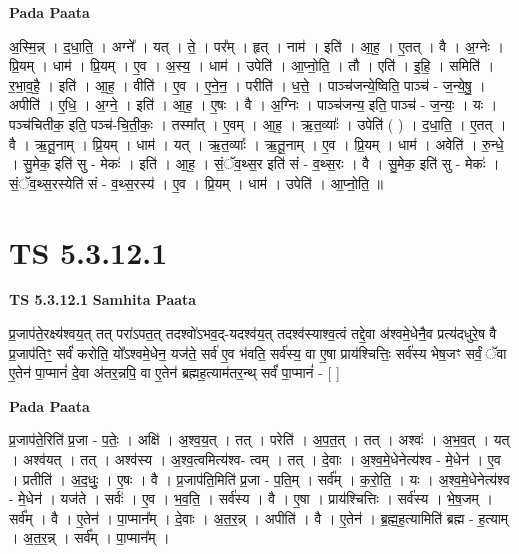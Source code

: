 \documentclass[17pt]{extarticle}
\begin{document}
\textbf{Pada Paata} \newline

अ॒स्मि॒न्न् । द॒धा॒ति॒ । अग्ने᳚ । यत् । ते॒ । पर᳚म् । हृत् । नाम॑ । इति॑ । आ॒ह॒ । ए॒तत् । वै । अ॒ग्नेः । प्रि॒यम् । धाम॑ । प्रि॒यम् । ए॒व । अ॒स्य॒ । धाम॑ । उपेति॑ । आ॒प्नो॒ति॒ । तौ । एति॑ । इ॒हि॒ । समिति॑ । र॒भा॒व॒है॒ । इति॑ । आ॒ह॒ । वीति॑ । ए॒व । ए॒ने॒न॒ । परीति॑ । ध॒त्ते॒ । पाञ्च॑जन्ये॒ष्विति॒ पाञ्च॑ - ज॒न्ये॒षु॒ । अपीति॑ । ए॒धि॒ । अ॒ग्ने॒ । इति॑ । आ॒ह॒ । ए॒षः । वै । अ॒ग्निः । पाञ्च॑जन्य॒ इति॒ पाञ्च॑ - ज॒न्यः॒ । यः । पञ्च॑चितीक॒ इति॒ पञ्च॑-चि॒ती॒कः॒ । तस्मा᳚त् । ए॒वम् । आ॒ह॒ । ऋ॒त॒व्याः᳚ । उपेति॑ ( ) । द॒धा॒ति॒ । ए॒तत् । वै । ऋ॒तू॒नाम् । प्रि॒यम् । धाम॑ । यत् । ऋ॒त॒व्याः᳚ । ऋ॒तू॒नाम् । ए॒व । प्रि॒यम् । धाम॑ । अवेति॑ । रु॒न्धे॒ । सु॒मेक॒ इति॑ सु - मेकः॑ । इति॑ । आ॒ह॒ । सं॒ॅव॒थ्स॒र इति॑ सं - व॒थ्स॒रः । वै । सु॒मेक॒ इति॑ सु - मेकः॑ । सं॒ॅव॒थ्स॒रस्येति॑ सं - व॒थ्स॒रस्य॑ । ए॒व । प्रि॒यम् । धाम॑ । उपेति॑ । आ॒प्नो॒ति॒ ॥  \newline




\section*{ TS 5.3.12.1 }

\textbf{TS 5.3.12.1 } \newline
\textbf{Samhita Paata} \newline

प्र॒जाप॑ते॒रक्ष्य॑श्वय॒त् तत् परा॑ऽपत॒त् तदश्वो॑ऽभव॒द्-यदश्व॑य॒त् तदश्व॑स्याश्व॒त्वं तद्दे॒वा अ॑श्वमे॒धेनै॒व प्रत्य॑दधुरे॒ष वै प्र॒जाप॑तिꣳ॒॒ सर्वं॑ करोति॒ यो᳚ऽश्वमे॒धेन॒ यज॑ते॒ सर्व॑ ए॒व भ॑वति॒ सर्व॑स्य॒ वा ए॒षा प्राय॑श्चित्तिः॒ सर्व॑स्य भेष॒जꣳ सर्वं॒ ॅवा ए॒तेन॑ पा॒प्मानं॑ दे॒वा अ॑तर॒न्नपि॒ वा ए॒तेन॑ ब्रह्मह॒त्याम॑तर॒न्थ् सर्वं॑ पा॒प्मानं॑ - [  ] \newline

\textbf{Pada Paata} \newline

प्र॒जाप॑ते॒रिति॑ प्र॒जा - प॒तेः॒ । अक्षि॑ । अ॒श्व॒य॒त् । तत् । परेति॑ । अ॒प॒त॒त् । तत् । अश्वः॑ । अ॒भ॒व॒त् । यत् । अश्व॑यत् । तत् । अश्व॑स्य । अ॒श्व॒त्वमित्य॑श्व- त्वम् । तत् । दे॒वाः । अ॒श्व॒मे॒धेनेत्य॑श्व - मे॒धेन॑ । ए॒व । प्रतीति॑ । अ॒द॒धुः॒ । ए॒षः । वै । प्र॒जाप॑ति॒मिति॑ प्र॒जा - प॒ति॒म् । सर्व᳚म् । क॒रो॒ति॒ । यः । अ॒श्व॒मे॒धेनेत्य॑श्व - मे॒धेन॑ । यज॑ते । सर्वः॑ । ए॒व । भ॒व॒ति॒ । सर्व॑स्य । वै । ए॒षा । प्राय॑श्चित्तिः । सर्व॑स्य । भे॒ष॒जम् । सर्व᳚म् । वै । ए॒तेन॑ । पा॒प्मान᳚म् । दे॒वाः । अ॒त॒र॒न्न् । अपीति॑ । वै । ए॒तेन॑ । ब्र॒ह्म॒ह॒त्यामिति॑ ब्रह्म - ह॒त्याम् । अ॒त॒र॒न्न् । सर्व᳚म् । पा॒प्मान᳚म् ।  \newline
\end{document}
